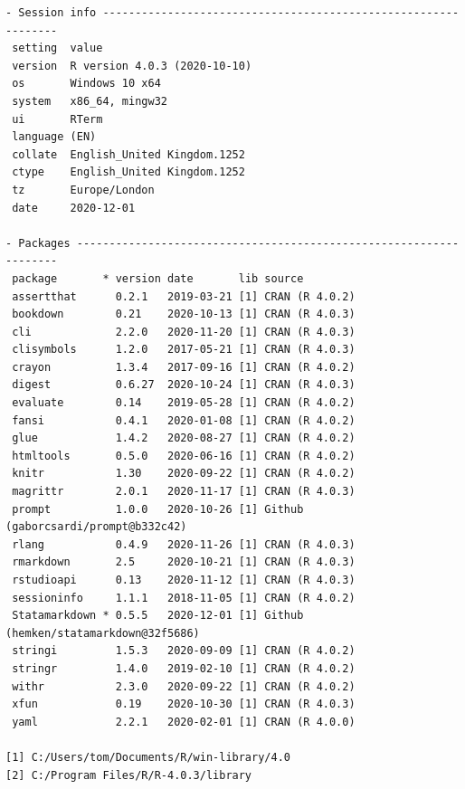 \documentclass[
  10pt,
]{book}
\begin{document}
\begin{verbatim}
- Session info ---------------------------------------------------------------
 setting  value                       
 version  R version 4.0.3 (2020-10-10)
 os       Windows 10 x64              
 system   x86_64, mingw32             
 ui       RTerm                       
 language (EN)                        
 collate  English_United Kingdom.1252 
 ctype    English_United Kingdom.1252 
 tz       Europe/London               
 date     2020-12-01                  

- Packages -------------------------------------------------------------------
 package       * version date       lib source                               
 assertthat      0.2.1   2019-03-21 [1] CRAN (R 4.0.2)                       
 bookdown        0.21    2020-10-13 [1] CRAN (R 4.0.3)                       
 cli             2.2.0   2020-11-20 [1] CRAN (R 4.0.3)                       
 clisymbols      1.2.0   2017-05-21 [1] CRAN (R 4.0.3)                       
 crayon          1.3.4   2017-09-16 [1] CRAN (R 4.0.2)                       
 digest          0.6.27  2020-10-24 [1] CRAN (R 4.0.3)                       
 evaluate        0.14    2019-05-28 [1] CRAN (R 4.0.2)                       
 fansi           0.4.1   2020-01-08 [1] CRAN (R 4.0.2)                       
 glue            1.4.2   2020-08-27 [1] CRAN (R 4.0.2)                       
 htmltools       0.5.0   2020-06-16 [1] CRAN (R 4.0.2)                       
 knitr           1.30    2020-09-22 [1] CRAN (R 4.0.2)                       
 magrittr        2.0.1   2020-11-17 [1] CRAN (R 4.0.3)                       
 prompt          1.0.0   2020-10-26 [1] Github (gaborcsardi/prompt@b332c42)  
 rlang           0.4.9   2020-11-26 [1] CRAN (R 4.0.3)                       
 rmarkdown       2.5     2020-10-21 [1] CRAN (R 4.0.3)                       
 rstudioapi      0.13    2020-11-12 [1] CRAN (R 4.0.3)                       
 sessioninfo     1.1.1   2018-11-05 [1] CRAN (R 4.0.2)                       
 Statamarkdown * 0.5.5   2020-12-01 [1] Github (hemken/statamarkdown@32f5686)
 stringi         1.5.3   2020-09-09 [1] CRAN (R 4.0.2)                       
 stringr         1.4.0   2019-02-10 [1] CRAN (R 4.0.2)                       
 withr           2.3.0   2020-09-22 [1] CRAN (R 4.0.2)                       
 xfun            0.19    2020-10-30 [1] CRAN (R 4.0.3)                       
 yaml            2.2.1   2020-02-01 [1] CRAN (R 4.0.0)                       

[1] C:/Users/tom/Documents/R/win-library/4.0
[2] C:/Program Files/R/R-4.0.3/library
\end{verbatim}

  

\backmatter
\end{document}
